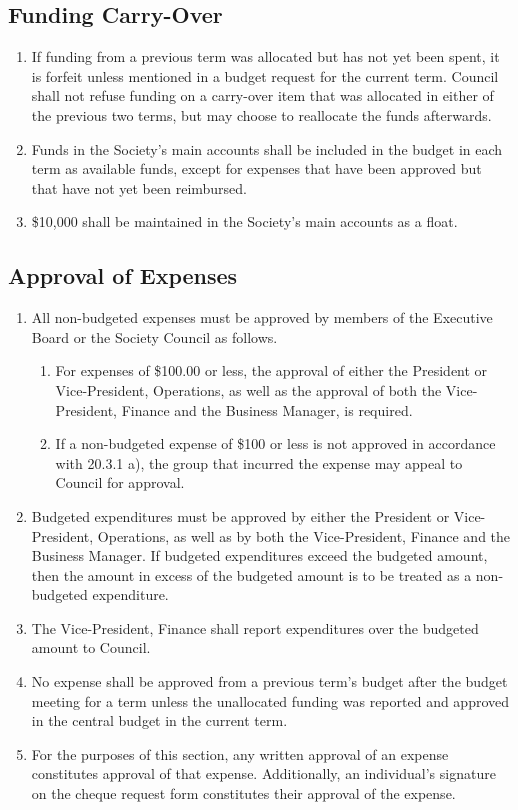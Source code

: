\subsection{Funding Carry-Over}
\begin{enumerate}
\item If funding from a previous term was allocated but has not yet been spent, it is forfeit unless mentioned in a budget request for the current term. Council shall not refuse funding on a carry-over item that was allocated in either of the previous two terms, but may choose to reallocate the funds afterwards.
\item Funds in the Society's main accounts shall be included in the budget in each term as available funds, except for expenses that have been approved but that have not yet been reimbursed.
\item \$10,000 shall be maintained in the Society's main accounts as a float.
\end{enumerate}

\subsection{Approval of Expenses}
\begin{enumerate}
\item All non-budgeted expenses must be approved by members of the Executive Board or the Society Council as follows.
\begin{enumerate}
\item For expenses of \$100.00 or less, the approval of either the President or Vice-President, Operations, as well as the approval of both the Vice-President, Finance and the Business Manager, is required.
\item If a non-budgeted expense of \$100 or less is not approved in accordance with 20.3.1 a), the group that incurred the expense may appeal to Council for approval.
\end{enumerate}
\item Budgeted expenditures must be approved by either the President or Vice-President, Operations, as well as by both the Vice-President, Finance and the Business Manager. If budgeted expenditures exceed the budgeted amount, then the amount in excess of the budgeted amount is to be treated as a non-budgeted expenditure.
\item The Vice-President, Finance shall report expenditures over the budgeted amount to Council.
\item No expense shall be approved from a previous term's budget after the budget meeting for a term unless the unallocated funding was reported and approved in the central budget in the current term.
\item For the purposes of this section, any written approval of an expense constitutes approval of that expense. Additionally, an individual's signature on the cheque request form constitutes their approval of the expense.
\end{enumerate}

